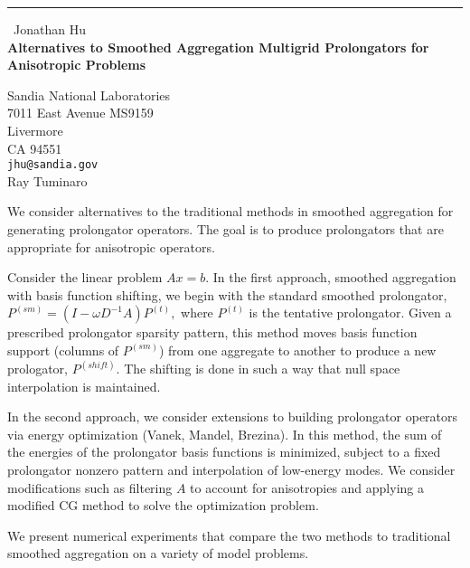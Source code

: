\documentclass{report}
\begin{document}
\begin{center}
\rule{6in}{1pt} \
{\large Jonathan Hu \\
{\bf Alternatives to Smoothed Aggregation Multigrid Prolongators for Anisotropic Problems}}

Sandia National Laboratories \\ 7011 East Avenue MS9159 \\ Livermore \\ CA 94551
\\
{\tt jhu@sandia.gov}\\
Ray Tuminaro\end{center}

We consider alternatives to the traditional methods in smoothed
aggregation for generating prolongator operators. The goal is to produce
prolongators that are appropriate for anisotropic operators.

Consider the linear problem $Ax=b$. In the first approach, smoothed
aggregation with basis function shifting, we begin with the standard
smoothed prolongator, $P^{(sm)} = (I - \omega D^{-1} A) P^{(t)},$ where
$P^{(t)}$ is the tentative prolongator. Given a prescribed prolongator
sparsity pattern, this method moves
basis function support (columns of $P^{(sm)}$) from one aggregate to
another to produce a new prologator, $P^{(shift)}$. The shifting is done
in such a way that null space interpolation is maintained.

In the second approach, we consider extensions to building prolongator
operators via energy optimization (Vanek, Mandel, Brezina). In this
method, the sum of the energies of the prolongator basis functions is
minimized, subject to a fixed prolongator nonzero pattern and
interpolation of low-energy
modes. We consider modifications such as filtering $A$ to account for
anisotropies and applying a modified CG method to solve the optimization
problem.

We present numerical experiments that compare the two methods to
traditional smoothed aggregation on a variety of model problems.
\end{document}
